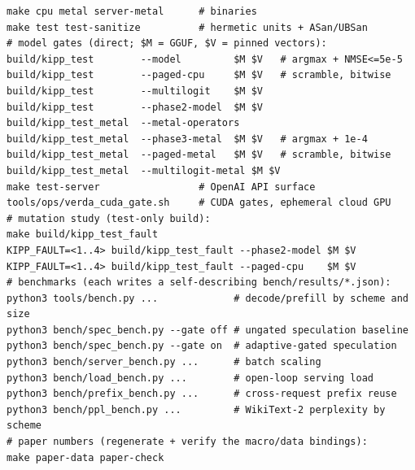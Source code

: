\documentclass[sigconf,nonacm,screen]{acmart}
\begin{document}
\begin{lstlisting}
make cpu metal server-metal      # binaries
make test test-sanitize          # hermetic units + ASan/UBSan
# model gates (direct; $M = GGUF, $V = pinned vectors):
build/kipp_test        --model         $M $V   # argmax + NMSE<=5e-5
build/kipp_test        --paged-cpu     $M $V   # scramble, bitwise
build/kipp_test        --multilogit    $M $V
build/kipp_test        --phase2-model  $M $V
build/kipp_test_metal  --metal-operators
build/kipp_test_metal  --phase3-metal  $M $V   # argmax + 1e-4
build/kipp_test_metal  --paged-metal   $M $V   # scramble, bitwise
build/kipp_test_metal  --multilogit-metal $M $V
make test-server                 # OpenAI API surface
tools/ops/verda_cuda_gate.sh     # CUDA gates, ephemeral cloud GPU
# mutation study (test-only build):
make build/kipp_test_fault
KIPP_FAULT=<1..4> build/kipp_test_fault --phase2-model $M $V
KIPP_FAULT=<1..4> build/kipp_test_fault --paged-cpu    $M $V
# benchmarks (each writes a self-describing bench/results/*.json):
python3 tools/bench.py ...             # decode/prefill by scheme and size
python3 bench/spec_bench.py --gate off # ungated speculation baseline
python3 bench/spec_bench.py --gate on  # adaptive-gated speculation
python3 bench/server_bench.py ...      # batch scaling
python3 bench/load_bench.py ...        # open-loop serving load
python3 bench/prefix_bench.py ...      # cross-request prefix reuse
python3 bench/ppl_bench.py ...         # WikiText-2 perplexity by scheme
# paper numbers (regenerate + verify the macro/data bindings):
make paper-data paper-check
\end{lstlisting}
\end{document}

